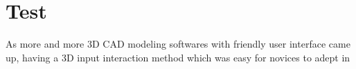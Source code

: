 \chapter{Test}
\label{c:intro}
\cite{3Dconnexion}
As more and more 3D CAD modeling softwares with friendly user interface came up, having a 3D input interaction method which was easy for novices to adept in 